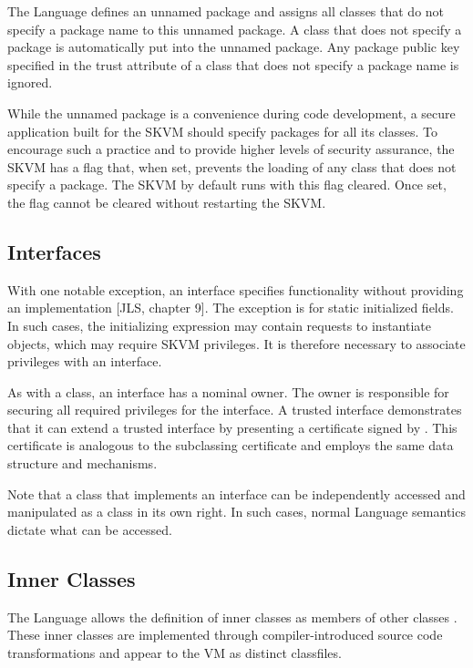 \documentclass{llncs}
\begin{document}
The Language defines an unnamed package and assigns all classes
that do not specify a package name to this unnamed package. A class
that does not specify a package is automatically put into the unnamed
package. Any package public key specified in the trust attribute
of a class that does not specify a package name is ignored.

While the unnamed package is a convenience during code development,
a secure application built for the SKVM should specify packages for
all its classes. To encourage such a practice and to provide higher
levels of security assurance, the SKVM has a flag that, when set,
prevents the loading of any class that does not specify a package.
The SKVM by default runs with this flag cleared. Once set, the flag
cannot be cleared without restarting the SKVM.

\subsection{Interfaces}

With one notable exception, an interface specifies functionality
without providing an implementation [JLS, chapter 9]. The exception
is for static initialized fields. In such cases, the initializing
expression may contain requests to instantiate objects, which may
require SKVM privileges. It is therefore necessary to associate
privileges with an interface.

As with a class, an interface has a nominal owner. The owner is
responsible for securing all required privileges for the interface.
A trusted interface  demonstrates that it can extend a trusted
interface  by presenting a certificate signed by . This certificate
is analogous to the subclassing certificate and employs the same
data structure and mechanisms.

Note that a class that implements an interface can be independently
accessed and manipulated as a class in its own right. In such cases,
normal Language semantics dictate what can be accessed.

\subsection{Inner Classes}

The Language allows the definition of inner classes as members of
other classes \cite[section 8.1.2]{jls}. These inner classes are implemented
through compiler-introduced source code transformations and appear
to the VM as distinct classfiles.
\end{document}
